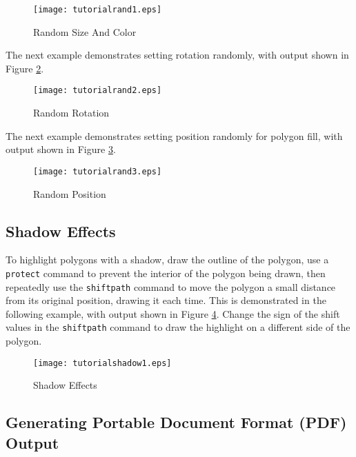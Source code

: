 

\begin{figure}[h]
\texttt{[image: tutorialrand1.eps]}
\caption{Random Size And Color}
\label{tutorialrand1}
\end{figure}

The next example demonstrates setting rotation randomly, with output shown in
Figure \ref{tutorialrand2}.



\begin{figure}[h]
\texttt{[image: tutorialrand2.eps]}
\caption{Random Rotation}
\label{tutorialrand2}
\end{figure}

The next example demonstrates setting position randomly for polygon fill, with
output shown in Figure \ref{tutorialrand3}.



\begin{figure}[h]
\texttt{[image: tutorialrand3.eps]}
\caption{Random Position}
\label{tutorialrand3}
\end{figure}

\subsection{Shadow Effects}

To highlight polygons with a shadow, draw the outline of the polygon, use a
\texttt{protect} command to prevent the interior of the polygon being drawn,
then repeatedly use the \texttt{shiftpath} command to move the polygon a small
distance from its original position, drawing it each time.  This is
demonstrated in the following example, with output shown in Figure
\ref{tutorialshadow1}.  Change the sign of the shift values in the
\texttt{shiftpath} command to draw the highlight on a different side of the
polygon.



\begin{figure}[h]
\texttt{[image: tutorialshadow1.eps]}
\caption{Shadow Effects}
\label{tutorialshadow1}
\end{figure}

\subsection{Generating Portable Document Format (PDF) Output}
\label{pdf}

